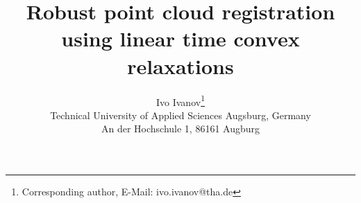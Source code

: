 \documentclass[10pt,twocolumn,letterpaper]{article}
\title{Robust point cloud registration using linear time convex relaxations}
\author{Ivo Ivanov\thanks{Corresponding author, E-Mail: ivo.ivanov@tha.de}\\
Technical University of Applied Sciences Augsburg, Germany\\
An der Hochschule 1, 86161 Augburg\\
}
\begin{document}
\maketitle
    





{
    \small
    
    
}


\end{document}
